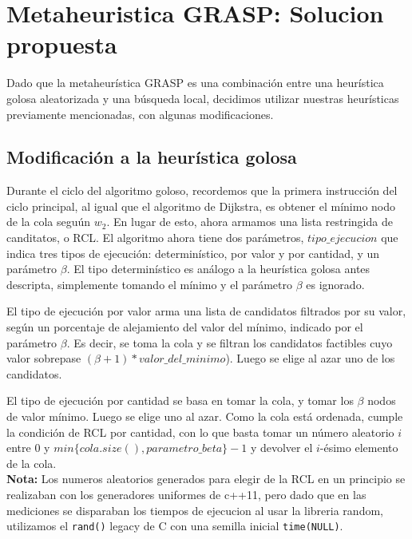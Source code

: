 \section{Metaheuristica GRASP: Solucion propuesta}

Dado que la metaheur\'istica GRASP es una combinaci\'on entre una heur\'istica golosa aleatorizada y una b\'usqueda local, decidimos utilizar nuestras heur\'isticas previamente mencionadas, con algunas modificaciones.

\subsection{Modificaci\'on a la heur\'istica golosa}

\vspace{2mm}

Durante el ciclo del algoritmo goloso, recordemos que la primera instrucci\'on del ciclo principal, al igual que el algoritmo de Dijkstra, es obtener el m\'inimo nodo de la cola segu\'un $w_2$. En lugar de esto, ahora armamos una lista restringida de canditatos, o RCL. El algoritmo ahora tiene dos par\'ametros, $tipo\_ejecucion$ que indica tres tipos de ejecuci\'on: determin\'istico, por valor y por cantidad, y un par\'ametro $\beta$. El tipo determin\'istico es an\'alogo a la heur\'istica golosa antes descripta, simplemente tomando el m\'inimo y el par\'ametro $\beta$ es ignorado.

\vspace{2mm}

El tipo de ejecuci\'on por valor arma una lista de candidatos filtrados por su valor, seg\'un un porcentaje de alejamiento del valor del m\'inimo, indicado por el par\'ametro $\beta$. Es decir, se toma la cola y se filtran los candidatos factibles cuyo valor sobrepase $(\beta + 1)*valor\_del\_minimo$). Luego se elige al azar uno de los candidatos. 
\vspace{2mm}

El tipo de ejecuci\'on por cantidad se basa en tomar la cola, y tomar los $\beta$ nodos de valor m\'inimo. Luego se elige uno al azar. Como la cola est\'a ordenada, cumple la condici\'on de RCL por cantidad, con lo que basta tomar un n\'umero aleatorio $i$ entre $0$ y  $min\{cola.size(), parametro\_beta\} -1$ y devolver el $i$-\'esimo elemento de la cola.\\
\textbf{Nota: } Los numeros aleatorios generados para elegir de la RCL en un principio se realizaban con los generadores uniformes de c++11, pero dado que en las mediciones se disparaban los tiempos de ejecucion al usar la libreria random, utilizamos el \texttt{rand()} legacy de C con una semilla inicial \texttt{time(NULL)}.
\vspace{2mm}

